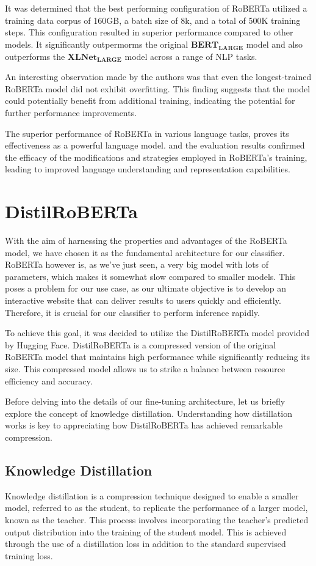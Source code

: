 \documentclass[a4paper,10pt]{report} %
\begin{document}
It was determined that the best performing configuration of RoBERTa utilized a training data corpus of 160GB, a batch size of 8k, and a total of 500K training steps. This configuration resulted in superior performance compared to other models. It significantly outpermorms the original $\mathbf{BERT_{LARGE}}$ model and also outperforms the $\mathbf{XLNet_{LARGE}}$ model across a range of NLP tasks.

An interesting observation made by the authors was that even the longest-trained RoBERTa model did not exhibit overfitting. This finding suggests that the model could potentially benefit from additional training, indicating the potential for further performance improvements.

The superior performance of RoBERTa in various language tasks, proves its effectiveness as a powerful language model. and the evaluation results confirmed the efficacy of the modifications and strategies employed in RoBERTa's training, leading to improved language understanding and representation capabilities.

\section{DistilRoBERTa} %
With the aim of harnessing the properties and advantages of the RoBERTa model, we have chosen it as the fundamental architecture for our classifier. RoBERTa however is, as we've just seen, a very big model with lots of parameters, which makes it somewhat slow compared to smaller models. This poses a problem for our use case, as our ultimate objective is to develop an interactive website that can deliver results to users quickly and efficiently. Therefore, it is crucial for our classifier to perform inference rapidly.

To achieve this goal, it was decided to utilize the DistilRoBERTa model provided by Hugging Face. DistilRoBERTa is a compressed version of the original RoBERTa model that maintains high performance while significantly reducing its size. This compressed model allows us to strike a balance between resource efficiency and accuracy.

Before delving into the details of our fine-tuning architecture, let us briefly explore the concept of knowledge distillation. Understanding how distillation works is key to appreciating how DistilRoBERTa has achieved remarkable compression.

\subsection{Knowledge Distillation} %
Knowledge distillation is a compression technique designed to enable a smaller model, referred to as the student, to replicate the performance of a larger model, known as the teacher. This process involves incorporating the teacher's predicted output distribution into the training of the student model. This is achieved through the use of a distillation loss in addition to the standard supervised training loss.
\end{document}
